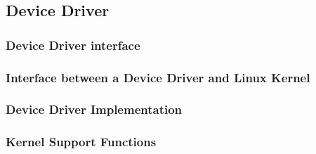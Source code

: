 \subsection{Device Driver} %
\begin{frame}[fragile]
    \frametitle{Device Driver interface}
\end{frame}
% 
% 
% 
\begin{frame}[fragile]
    \frametitle{Interface between a Device Driver and Linux Kernel}
\end{frame}
% 
% 
\begin{frame}[fragile]
    \frametitle{Device Driver Implementation}
\end{frame}
% 
% 
\begin{frame}[fragile]
    \frametitle{Kernel Support Functions}
\end{frame}
% 
% 
